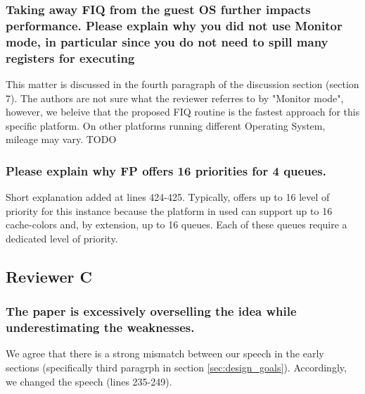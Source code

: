         \subsubsection{Taking away FIQ from the guest OS further impacts performance. Please explain why you did not use Monitor mode, in particular since you do not need to spill many registers for executing}
            This matter is discussed in the fourth paragraph of the discussion section (section 7).
            The authors are not sure what the reviewer referres to by "Monitor mode", however, we beleive that the proposed FIQ routine is the fastest approach for this specific platform. On other platforms running different Operating System, mileage may vary.
            TODO

        \subsubsection{Please explain why FP offers 16 priorities for 4 queues.}
            Short explanation added at lines 424-425. Typically, \schim offers up to 16 level of priority for this instance because the platform in used can support up to 16 cache-colors and, by extension, up to 16 queues. Each of these queues require a dedicated level of priority.

    \subsection{Reviewer C}
        \subsubsection{The paper is excessively overselling the idea while underestimating the weaknesses.}
            We agree that there is a strong mismatch between our speech in the early sections (specifically third paragrph in section \ref{sec:design_goals}).
            Accordingly, we changed the speech (lines 235-249).

